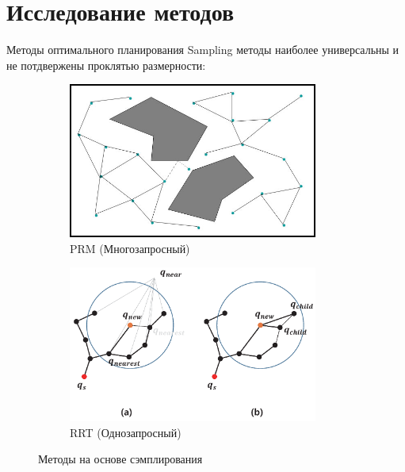 \documentclass[11pt, aspectratio=169]{beamer}
\begin{document}
\section{Исследование методов}
\begin{frame}{Методы оптимального планирования}
    Sampling методы наиболее универсальны и не потдвержены проклятью размерности:
    \begin{figure}[ht]
        \begin{subfigure}[b]{0.48\textwidth}
            \centering
            \includegraphics[width=0.9\textwidth]{figures/prm-example.png}
            \caption{PRM (Многозапросный)}
            \label{fig:prm-example}
        \end{subfigure}
        \begin{subfigure}[b]{0.48\textwidth}
            \centering
            \includegraphics[width=0.9\textwidth]{figures/rrt-example.png}
            \caption{RRT (Однозапросный)}
            \label{fig:rrt-example}
        \end{subfigure}
        \caption{Методы на основе сэмплирования}
    \end{figure}
\end{frame}
\end{document}
